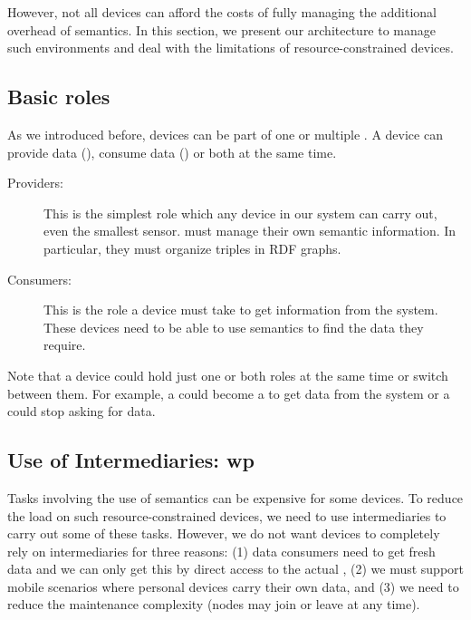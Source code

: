 However, not all devices can afford the costs of fully managing the additional overhead of semantics.
In this section, we present our architecture to manage such environments and deal with the limitations of resource-constrained devices.

\subsection{Basic roles}
As we introduced before, devices can be part of one or multiple \Spaces{}.
A device can provide data (\providers{}), consume data (\consumers{}) or both at the same time.

\begin{description}
\item[Providers:]
This is the simplest role which any device in our system can carry out, even the smallest sensor.
\providers{} must manage their own semantic information.
In particular, they must organize triples in RDF graphs.
\item[Consumers:]
This is the role a device must take to get information from the system.
These devices need to be able to use semantics to find the data they require.
\end{description}

Note that a device could hold just one or both roles at the same time or switch between them.
For example, a \provider{} could become a \consumer{} to get data from the system or a \consumer{} could stop asking for data.


\subsection{Use of Intermediaries: \acl{wp}}
Tasks involving the use of semantics can be expensive for some devices.
To reduce the load on such resource-constrained devices, we need to use intermediaries to carry out some of these tasks.
However, we do not want devices to completely rely on intermediaries for three reasons:
(1) data consumers need to get fresh data and we can only get this by direct access to the actual \provider{},
(2) we must support mobile scenarios where personal devices carry their own data,
and (3) we need to reduce the maintenance complexity (nodes may join or leave at any time).

